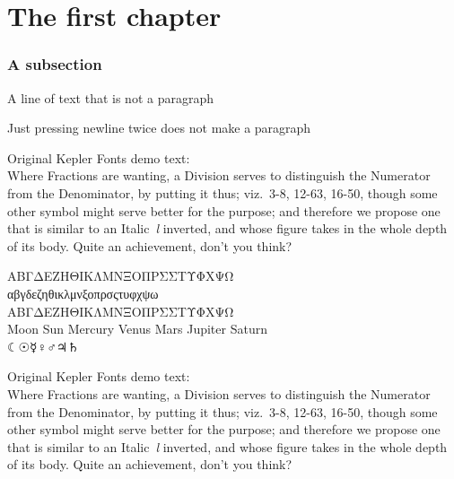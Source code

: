 \documentclass[a4paper,latin]{book}
\begin{document}
\chapter{The first chapter}
\subsection{A subsection}
A line of text that is not a paragraph

Just pressing newline twice does not make a paragraph

Original Kepler Fonts demo text:\\
Where Fractions are wanting, a Division serves to distinguish the
Numerator from the Denominator, by putting it thus; viz.\ 3-8, 12-63, 
16-50, though some other symbol might serve better for the purpose; and
therefore we propose one that is similar to an Italic~\textit{l}
inverted, and whose figure takes in the whole depth of its body.
Quite an achievement, don't you think?

ΑΒΓΔΕΖΗΘΙΚΛΜΝΞΟΠΡΣΣΤΥΦΧΨΩ\\
αβγδεζηθικλμνξοπρσςτυφχψω\\
ΑΒΓΔΕΖΗΘΙΚΛΜΝΞΟΠΡΣΣΤΥΦΧΨΩ\\

Moon Sun Mercury Venus Mars Jupiter Saturn\\
☾☉☿♀♂♃♄

Original Kepler Fonts demo text:\\
Where Fractions are wanting, a Division serves to distinguish the
Numerator from the Denominator, by putting it thus; viz.\ 3-8, 12-63, 
16-50, though some other symbol might serve better for the purpose; and
therefore we propose one that is similar to an Italic~\textit{l}
inverted, and whose figure takes in the whole depth of its body.
Quite an achievement, don't you think?
\end{document}
